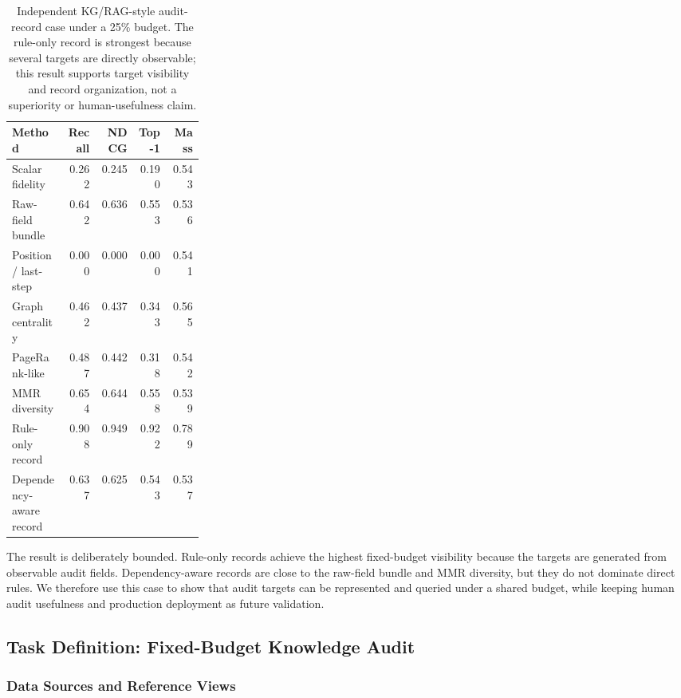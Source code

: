 \documentclass[pdflatex,sn-mathphys-num,iicol]{sn-jnl}
\begin{document}
\begin{table}[t]
\caption{Independent KG/RAG-style audit-record case under a 25\% budget. The rule-only record is strongest because several targets are directly observable; this result supports target visibility and record organization, not a superiority or human-usefulness claim.}
\label{tab:jiis-audit-case}
\centering
\small
\renewcommand{\arraystretch}{1.06}
\begin{tabular}{Z{0.28\linewidth}rrrr}
\toprule
\textbf{Method} & \textbf{Recall} & \textbf{NDCG} & \textbf{Top-1} & \textbf{Mass} \\
\midrule
Scalar fidelity & 0.262 & 0.245 & 0.190 & 0.543 \\
Raw-field bundle & 0.642 & 0.636 & 0.553 & 0.536 \\
Position / last-step & 0.000 & 0.000 & 0.000 & 0.541 \\
Graph centrality & 0.462 & 0.437 & 0.343 & 0.565 \\
PageRank-like & 0.487 & 0.442 & 0.318 & 0.542 \\
MMR diversity & 0.654 & 0.644 & 0.558 & 0.539 \\
Rule-only record & 0.908 & 0.949 & 0.922 & 0.789 \\
Dependency-aware record & 0.637 & 0.625 & 0.543 & 0.537 \\
\bottomrule
\end{tabular}
\end{table}

The result is deliberately bounded. Rule-only records achieve the highest fixed-budget visibility because the targets are generated from observable audit fields. Dependency-aware records are close to the raw-field bundle and MMR diversity, but they do not dominate direct rules. We therefore use this case to show that audit targets can be represented and queried under a shared budget, while keeping human audit usefulness and production deployment as future validation.

\subsection{Task Definition: Fixed-Budget Knowledge Audit}
\label{sec:application-setup}

\subsubsection{Data Sources and Reference Views}
\end{document}
